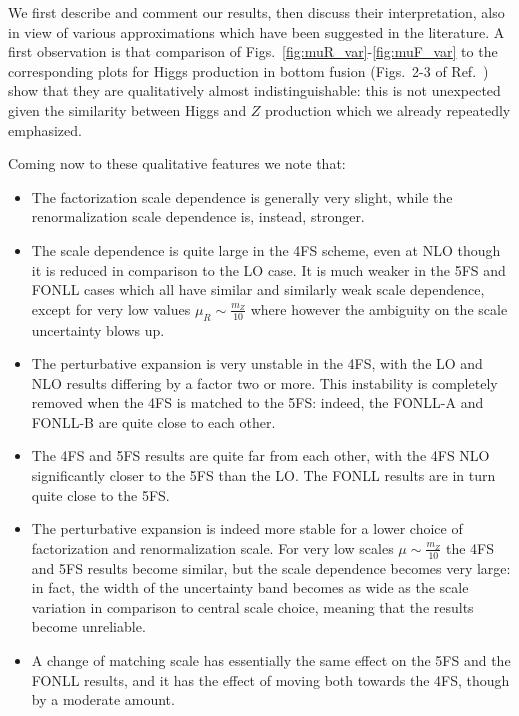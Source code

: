 \documentclass[12pt]{article}
\begin{document}




We first describe and comment our
results, then discuss their interpretation, also in view of various
approximations which have been suggested in the literature. A first observation is that  comparison of
Figs.~\ref{fig:muR_var}-\ref{fig:muF_var} to the corresponding
plots for Higgs production in bottom fusion (Figs.~2-3 of
Ref.~\cite{Forte:2016sja}) show that they are qualitatively almost
indistinguishable: this is not unexpected given the similarity between
Higgs and $Z$ production which we already repeatedly emphasized. 

Coming now to these qualitative features we note that:
\begin{itemize}
\item The factorization scale dependence is generally very slight,
  while the renormalization scale dependence is, instead, stronger.
\item The scale dependence is quite large in the 4FS scheme, even at
  NLO though it is reduced in comparison to the LO case. It is much
  weaker in the 5FS and FONLL cases which all have similar and
  similarly weak scale dependence, except for very low values
  $\mu_R\sim \frac{m_Z}{10}$ where however the ambiguity on the scale
  uncertainty blows up. 
\item The perturbative expansion is  very
  unstable in the 4FS, with the LO and NLO results differing by a
  factor two or more. This instability is completely removed when the
  4FS is matched to the 5FS: indeed, the FONLL-A and FONLL-B are quite
  close to each other.
\item The 4FS and 5FS results are quite far from each other, with
  the 4FS NLO significantly
  closer to the 5FS than the LO. The FONLL results are in turn quite close to the 5FS.
\item The perturbative expansion is indeed more stable for a lower
  choice of factorization and renormalization scale. For very low
  scales $\mu\sim\frac{m_Z}{10}$ the 4FS and 5FS results become
  similar, but the scale dependence becomes very large: in fact, the
  width of the uncertainty band becomes as wide as the scale variation
  in comparison to central scale choice, meaning that the results
  become unreliable.
\item A change of matching scale has essentially the same effect on
  the 5FS and the FONLL results, and it has the effect of moving both
  towards the 4FS, though by a moderate amount.
\end{itemize}
\end{document}
